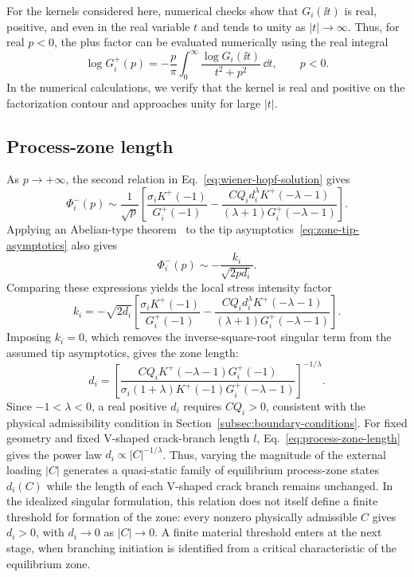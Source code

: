 For the kernels considered here, numerical checks show that
$G_i(\ii t)$ is real, positive, and even in the real variable $t$ and
tends to unity as $|t|\to\infty$.
Thus, for real $p<0$, the plus factor can be evaluated numerically
using the real integral
\begin{equation*}
  \log G_i^+(p)
  =-\frac{p}{\pi}\int_0^\infty
    \frac{\log G_i(\ii t)}{t^2+p^2}\,\dd t,
  \qquad p<0.
\end{equation*}
In the numerical calculations, we verify that the kernel is real and
positive on the factorization contour and approaches unity for large
$|t|$.

\subsection{Process-zone length}
\label{subsec:zone-length}

As $p\to+\infty$, the second relation in
Eq.~\eqref{eq:wiener-hopf-solution} gives
\begin{equation*}
  \Phi_i^-(p)\sim\frac{1}{\sqrt{p}}
  \left[
    \frac{\sigma_iK^+(-1)}{G_i^+(-1)}
    -\frac{CQ_i d_i^\lambda K^+(-\lambda-1)}
    {(\lambda+1)G_i^+(-\lambda-1)}
  \right].
\end{equation*}
Applying an Abelian-type theorem~\cite{noble1958wienerhopf} to the
tip asymptotics~\eqref{eq:zone-tip-asymptotics} also gives
\begin{equation*}
  \Phi_i^-(p)\sim-\frac{k_i}{\sqrt{2pd_i}}.
\end{equation*}
Comparing these expressions yields the local stress intensity factor
\begin{equation*}
  k_i=-\sqrt{2d_i}
  \left[
    \frac{\sigma_iK^+(-1)}{G_i^+(-1)}
    -\frac{CQ_i d_i^\lambda K^+(-\lambda-1)}
    {(\lambda+1)G_i^+(-\lambda-1)}
  \right].
\end{equation*}
Imposing $k_i=0$, which removes the inverse-square-root singular term
from the assumed tip asymptotics, gives the zone length:
\begin{equation}
\label{eq:process-zone-length}
  d_i=
  \left[
    \frac{CQ_iK^+(-\lambda-1)G_i^+(-1)}
    {\sigma_i(1+\lambda)K^+(-1)G_i^+(-\lambda-1)}
  \right]^{-1/\lambda}.
\end{equation}
Since $-1<\lambda<0$, a real positive $d_i$ requires $CQ_i>0$,
consistent with the physical admissibility condition in
Section~\ref{subsec:boundary-conditions}. For fixed geometry and fixed
V-shaped crack-branch length $l$, Eq.~\eqref{eq:process-zone-length}
gives the power law
$d_i\propto |C|^{-1/\lambda}$. Thus, varying the magnitude of the
external loading $|C|$ generates a quasi-static family of equilibrium
process-zone states $d_i(C)$ while the length of each V-shaped crack
branch remains unchanged. In the idealized singular formulation, this
relation does not itself define a finite threshold for formation of the
zone: every nonzero physically admissible $C$ gives $d_i>0$, with
$d_i\to0$ as $|C|\to0$. A finite material threshold enters at the next
stage, when branching initiation is identified from a critical
characteristic of the equilibrium zone.

